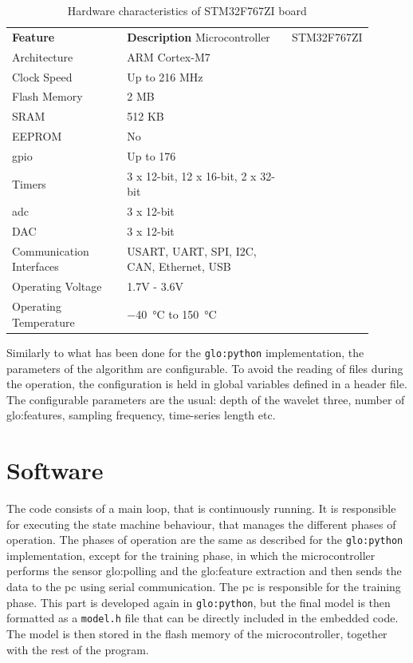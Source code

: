 \begin{longtable}{p{0.35\linewidth}p{0.55\linewidth}}
    \caption{Hardware characteristics of STM32F767ZI board}    \label{tab:stm32f767zi}\\
    \toprule
    \textbf{Feature} & \textbf{Description} \endfirsthead 
    \hline
    Microcontroller & STM32F767ZI \\
    Architecture & ARM Cortex-M7 \\
    Clock Speed & Up to 216 MHz \\
    Flash Memory & 2 MB \\
    SRAM & 512 KB \\
    EEPROM & No \\
    \gls{gpio} & Up to 176 \\
    Timers & 3 x 12-bit, 12 x 16-bit, 2 x 32-bit \\
    \gls{adc} & 3 x 12-bit \\
    DAC & 3 x 12-bit \\
    Communication Interfaces & USART, UART, SPI, I2C, CAN, Ethernet, USB \\
    Operating Voltage & 1.7V - 3.6V \\
    Operating Temperature & \SI{-40}{\celsius} to \SI{+150}{\celsius} \\
    \bottomrule    
\end{longtable}

Similarly to what has been done for the \texttt{\gls{glo:python}} implementation, the parameters of the algorithm are configurable. To avoid the reading of files during the operation, the configuration is held in global variables defined in a header file. The configurable parameters are the usual: depth of the wavelet three, number of \gls{glo:feature}s, sampling frequency, time-series length etc.

\section{Software}
The code consists of a main loop, that is continuously running. It is responsible for executing the state machine behaviour, that manages the different phases of operation. The phases of operation are the same as described for the \texttt{\gls{glo:python}} implementation, except for the training phase, in which the microcontroller performs the sensor \gls{glo:polling} and the \gls{glo:feature} extraction and then sends the data to the \gls{pc} using serial communication. The \gls{pc} is responsible for the training phase. This part is developed again in \texttt{\gls{glo:python}}, but the final model is then formatted as a \texttt{model.h} file that can be directly included in the embedded code. The model is then stored in the flash memory of the microcontroller, together with the rest of the program.

